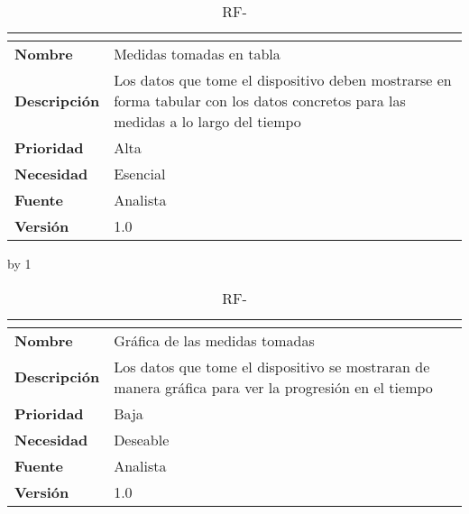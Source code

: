 \begin{table}[H]
	\caption{RF-\number\rf}
	\begin{tabular}{|l|p{}|}
		\hline
		\multicolumn{2}{|c|}{\cellcolor[HTML]{BFBFBF}{\color[HTML]{000000} \textbf{RF-\number\rf}}} \\ \hline
		\textbf{Nombre}      & Medidas tomadas en tabla                                                                                                          \\ \hline
		\textbf{Descripción} & Los datos que tome el dispositivo deben mostrarse en forma tabular con los datos concretos para las medidas a lo largo del tiempo \\ \hline
		\textbf{Prioridad}   & Alta                                                                                                                              \\ \hline
		\textbf{Necesidad}   & Esencial                                                                                                                          \\ \hline
		\textbf{Fuente}      & Analista                                                                                                                          \\ \hline
		\textbf{Versión}     & 1.0                                                                                                                               \\ \hline
	\end{tabular}
\end{table}
\advance\rf by 1
\begin{table}[H]
	\caption{RF-\number\rf}
	\begin{tabular}{|l|p{}|}
		\hline
		\multicolumn{2}{|c|}{\cellcolor[HTML]{BFBFBF}{\color[HTML]{000000} \textbf{RF-\number\rf}}} \\ \hline
		\textbf{Nombre}      & Gráfica de las medidas tomadas                                                                       \\ \hline
		\textbf{Descripción} & Los datos que tome el dispositivo se mostraran de manera gráfica para ver la progresión en el tiempo \\ \hline
		\textbf{Prioridad}   & Baja                                                                                                 \\ \hline
		\textbf{Necesidad}   & Deseable                                                                                             \\ \hline
		\textbf{Fuente}      & Analista                                                                                             \\ \hline
		\textbf{Versión}     & 1.0                                                                                                  \\ \hline
	\end{tabular}
\end{table}

